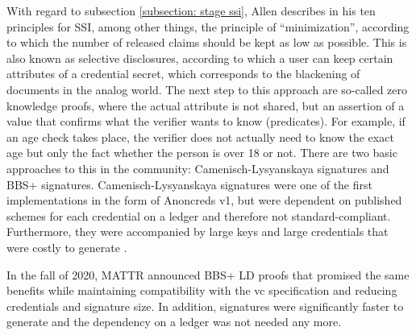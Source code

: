		With regard to subsection \ref{subsection: stage ssi}, Allen describes in his ten principles for SSI, among other things, the principle of “minimization”, according to which the number of released claims should be kept as low as possible. This is also known as selective disclosures, according to which a user can keep certain attributes of a credential secret, which corresponds to the blackening of documents in the analog world. The next step to this approach are so-called zero knowledge proofs, where the actual attribute is not shared, but an assertion of a value that confirms what the verifier wants to know (predicates). For example, if an age check takes place, the verifier does not actually need to know the exact age but only the fact whether the person is over 18 or not. There are two basic approaches to this in the community: Camenisch-Lysyanskaya signatures and BBS+ signatures. Camenisch-Lysyanskaya signatures were one of the first implementations in the form of Anoncreds v1, but were dependent on published schemes for each credential on a ledger and therefore not standard-compliant. Furthermore, they were accompanied by large keys and large credentials that were costly to generate \cite{zundel_why_2021}. \cite[pp. 17-18]{young_verifiable_2021}
		
		In the fall of 2020, MATTR announced BBS+ LD proofs that promised the same benefits while maintaining compatibility with the \ac{vc} specification and reducing credentials and signature size. In addition, signatures were significantly faster to generate and the dependency on a ledger was not needed any more. \cite{zundel_why_2021}
		
